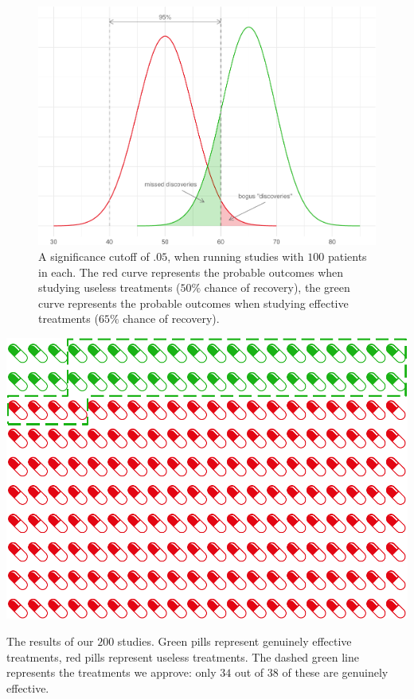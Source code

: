 \documentclass[justified]{tufte-book}
\theoremstyle{definition}
\theoremstyle{definition}
\theoremstyle{definition}
\theoremstyle{definition}
\theoremstyle{remark}
\begin{document}
\begin{figure}
\includegraphics{_main_files/figure-latex/hundredstudies-1} \caption[A significance cutoff of $.05$, when running studies with $100$ patients in each]{A significance cutoff of $.05$, when running studies with $100$ patients in each. The red curve represents the probable outcomes when studying useless treatments ($50\%$ chance of recovery), the green curve represents the probable outcomes when studying effective treatments ($65\%$ chance of recovery).}\label{fig:hundredstudies}
\end{figure}

\begin{marginfigure}
\includegraphics{_main_files/figure-latex/hundredstudiesgrid-1} \caption[The results of our $200$ studies]{The results of our $200$ studies. Green pills represent genuinely effective treatments, red pills represent useless treatments. The dashed green line represents the treatments we approve: only $34$ out of $38$ of these are genuinely effective.}\label{fig:hundredstudiesgrid}
\end{marginfigure}
\end{document}
